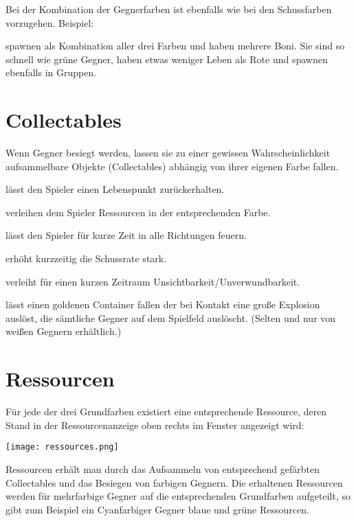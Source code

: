 Bei der Kombination der Gegnerfarben ist ebenfalls wie bei den Schussfarben vorzugehen. Beispiel:

{spawnen als Kombination aller drei Farben und haben mehrere Boni. Sie sind so schnell wie grüne Gegner, haben etwas weniger Leben als Rote und spawnen ebenfalls in Gruppen.}




\section{Collectables}

Wenn Gegner besiegt werden, lassen sie zu einer gewissen Wahrscheinlichkeit aufsammelbare Objekte (Collectables) abhängig von ihrer eigenen Farbe fallen.

\renewcommand{\itmspace}{5.5em}
{lässt den Spieler einen Lebenspunkt zurückerhalten.}

{verleihen dem Spieler Ressourcen in der entsprechenden Farbe.}

{lässt den Spieler für kurze Zeit in alle Richtungen feuern.}

{erhöht kurzzeitig die Schussrate stark.}

{verleiht für einen kurzen Zeitraum Unsichtbarkeit/Unverwundbarkeit.}

{lässt einen goldenen Container fallen der bei Kontakt eine gro{\ss}e Explosion auslöst, die sämtliche Gegner auf dem Spielfeld auslöscht. (Selten und nur von wei{\ss}en Gegnern erhältlich.)}




\section{Ressourcen}

Für jede der drei Grundfarben existiert eine entsprechende Ressource, deren Stand in der Ressourcenanzeige oben rechts im Fenster angezeigt wird:

\texttt{[image: ressources.png]}

Ressourcen erhält man durch das Aufsammeln von entsprechend gefärbten Collectables und das Besiegen von farbigen Gegnern. Die erhaltenen Ressourcen werden für mehrfarbige Gegner auf die entsprechenden Grundfarben aufgeteilt, so gibt zum Beispiel ein Cyanfarbiger Gegner blaue und grüne Ressourcen.

